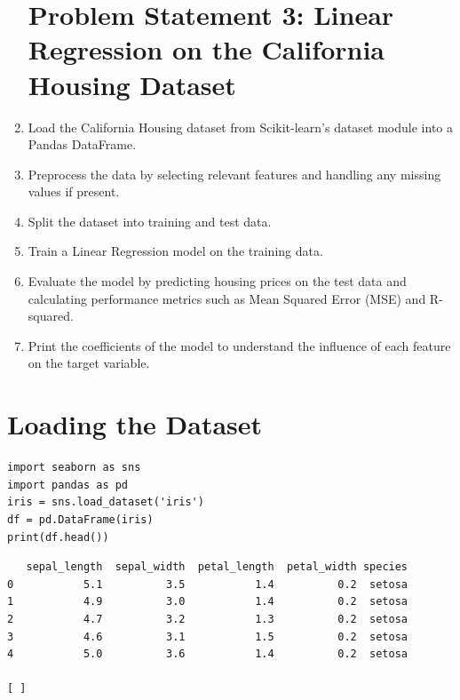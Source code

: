 \begin{enumerate}
        \section*{Problem Statement 3: Linear Regression on the California Housing Dataset}


    \item Load the California Housing dataset from Scikit-learn’s dataset module into a Pandas
DataFrame.
    \item Preprocess the data by selecting relevant features and handling any missing values
if present.
    \item Split the dataset into training and test data.
    \item Train a Linear Regression model on the training data.
    \item Evaluate the model by predicting housing prices on the test data and calculating
performance metrics such as Mean Squared Error (MSE) and R-squared.
   \item Print the coefficients of the model to understand the influence of each feature on the
target variable.
    
\end{enumerate}

\newpage

\vspace{-.15cm}
\section{Loading the Dataset}
\vspace{-.75cm}
\begin{code}
\begin{lstlisting}
import seaborn as sns
import pandas as pd
iris = sns.load_dataset('iris')
df = pd.DataFrame(iris)
print(df.head())
\end{lstlisting}
\end{code}
\vspace{-1cm}
\begin{verbatim} 
   sepal_length  sepal_width  petal_length  petal_width species
0           5.1          3.5           1.4          0.2  setosa
1           4.9          3.0           1.4          0.2  setosa
2           4.7          3.2           1.3          0.2  setosa
3           4.6          3.1           1.5          0.2  setosa
4           5.0          3.6           1.4          0.2  setosa

[ ]

\end{verbatim}
\vspace{-.6cm}
